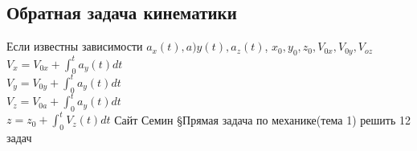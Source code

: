 \documentclass[a4paper, 12pt, oneside]{article}
\begin{document}
\subsection{Обратная задача кинематики}

Если известны зависимости $a_x(t), a)y(t),a_z(t)$, $x_0, y_0, z_0, V_{0x},V_{0y}, V_{oz}$\\
$V_x=V_{0x}+\int_0^t a_y(t)dt$\\
$V_y=V_{0y}+\int_0^t a_y(t)dt$\\
$V_z=V_{0a}+\int_0^t a_y(t)dt$\\
$z=z_0+\int_0^t V_z(t)dt$
Сайт Семин §Прямая задача по механике(тема 1) решить 12 задач
\end{document}
